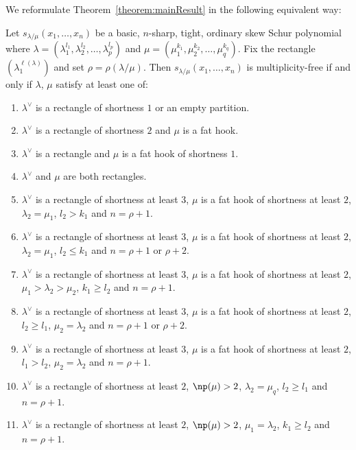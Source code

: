 We reformulate Theorem~\ref{theorem:mainResult} in the following equivalent way:


\begin{theorem}
\label{theorem:refomulatedResult}
Let $s_{\lambda / \mu}(x_1,\ldots,x_n)$ be a basic, $n$-sharp, tight, ordinary skew Schur polynomial where $\lambda = (\lambda_1^{l_1},\lambda_2^{l_2},\ldots,\lambda_p^{l_p})$ and $\mu = (\mu_1^{k_1},\mu_2^{k_2},\ldots,\mu_q^{k_q})$. Fix the rectangle $(\lambda_1^{\ell(\lambda)})$ and set $\rho = \rho(\lambda / \mu)$. Then $s_{\lambda / \mu}(x_1,\ldots,x_n)$ is multiplicity-free if and only if $\lambda$, $\mu$ satisfy at least one of:
\begin{enumerate}[label=(\Roman{*})]
	\item\label{theo3.1_1} $\lambda^\vee$ is a rectangle of shortness $1$ or an empty partition.
	\item\label{theo3.1_2} $\lambda^\vee$ is a rectangle of shortness $2$ and $\mu$ is a fat hook.
	\item\label{theo3.1_3} $\lambda^\vee$ is a rectangle and $\mu$ is a fat hook of shortness $1$.
	\item\label{theo3.1_4} $\lambda^\vee$ and $\mu$ are both rectangles.
	\item\label{theo3.1_5} $\lambda^\vee$ is a rectangle of shortness at least $3$, $\mu$ is a fat hook of shortness at least $2$, $\lambda_2 = \mu_1$, $l_2>k_1$ and $n = \rho+1$.
	\item\label{theo3.1_6} $\lambda^\vee$ is a rectangle of shortness at least $3$, $\mu$ is a fat hook of shortness at least $2$, $\lambda_2 = \mu_1$, $l_2\leq k_1$ and $n = \rho+1$ or $\rho+2$.
	\item\label{theo3.1_7} $\lambda^\vee$ is a rectangle of shortness at least $3$, $\mu$ is a fat hook of shortness at least $2$, $\mu_1>\lambda_2>\mu_2$, $k_1\geq l_2$ and $n = \rho+1$.
	\item\label{theo3.1_8} $\lambda^\vee$ is a rectangle of shortness at least $3$, $\mu$ is a fat hook of shortness at least $2$, $l_2\geq l_1$, $\mu_2=\lambda_2$ and $n = \rho+1$ or $\rho+2$.
	\item\label{theo3.1_9} $\lambda^\vee$ is a rectangle of shortness at least $3$, $\mu$ is a fat hook of shortness at least $2$, $l_1> l_2$, $\mu_2=\lambda_2$ and $n = \rho+1$.
	\item\label{theo3.1_10} $\lambda^\vee$ is a rectangle of shortness at least $2$, $\np (\mu)>2$, $\lambda_2 = \mu_q$, $l_2\geq l_1$ and $n = \rho+1$.
	\item\label{theo3.1_11} $\lambda^\vee$ is a rectangle of shortness at least $2$, $\np (\mu) > 2$, $\mu_1 = \lambda_2$, $k_1 \geq l_2$ and $n = \rho+1$.
\end{enumerate}
\end{theorem}

